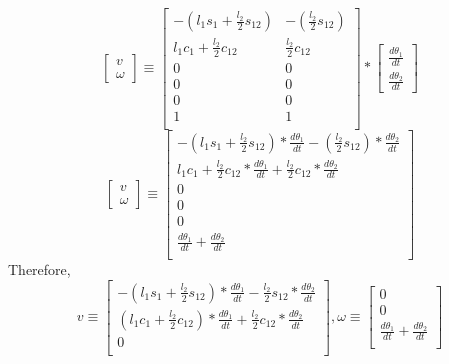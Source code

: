 \documentclass[12pt]{article}
\begin{document}
\[
  \begin{bmatrix} v \\ \omega \end{bmatrix}
  \equiv
  \begin{bmatrix}
    -(l_1s_1 + \frac{l_2}{2}s_{12}) & -(\frac{l_2}{2}s_{12})\\
    l_1c_1 + \frac{l_2}{2}c_{12} & \frac{l_2}{2}c_{12}\\
    0 & 0 \\
    0 & 0 \\
    0 & 0 \\
    1 & 1 \\
  \end{bmatrix}
  *
  \begin{bmatrix} \frac{d\theta_1}{dt} \\ \frac{d\theta_2}{dt} \end{bmatrix}
\]
\[
  \begin{bmatrix} v \\ \omega \end{bmatrix}
  \equiv
  \begin{bmatrix}
    -(l_1s_1 + \frac{l_2}{2}s_{12}) * \frac{d\theta_1}{dt} - (\frac{l_2}{2}s_{12}) * \frac{d\theta_2}{dt} \\
    l_1c_1 + \frac{l_2}{2}c_{12} * \frac{d\theta_1}{dt} + \frac{l_2}{2}c_{12} * \frac{d\theta_2}{dt}\\
    0 \\
    0 \\
    0 \\
    \frac{d\theta_1}{dt} + \frac{d\theta_2}{dt}\\
  \end{bmatrix}
\]
Therefore,
\[
  v
  \equiv
  \begin{bmatrix}
    -(l_1s_1 + \frac{l_2}{2}s_{12}) * \frac{d\theta_1}{dt} - \frac{l_2}{2}s_{12} * \frac{d\theta_2}{dt} \\
    (l_1c_1 + \frac{l_2}{2}c_{12}) * \frac{d\theta_1}{dt} + \frac{l_2}{2}c_{12} * \frac{d\theta_2}{dt}\\
    0 \\
  \end{bmatrix},
  \omega
  \equiv
  \begin{bmatrix}
    0 \\
    0 \\
    \frac{d\theta_1}{dt} + \frac{d\theta_2}{dt}\\
  \end{bmatrix}
\]

\pagebreak
\end{document}

